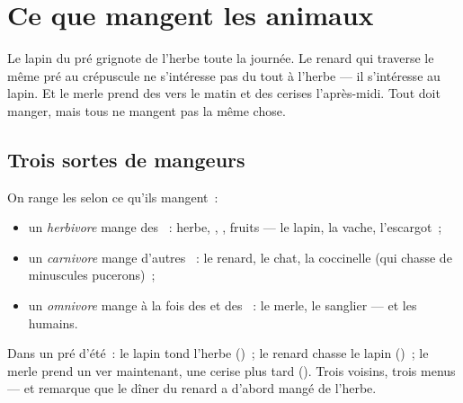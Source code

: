 \chapter{Ce que mangent les animaux}\label{ch:g2:what-animals-eat}

Le lapin du pré grignote de l'herbe toute la journée. Le renard qui
traverse le même pré au crépuscule ne s'intéresse pas du tout à
l'herbe --- il s'intéresse au lapin. Et le merle prend des vers le
matin et des cerises l'après-midi. Tout  doit manger, mais
tous ne mangent pas la même chose.

\section{Trois sortes de mangeurs}

\begin{definition}\label{def:g2:what-animals-eat:kinds}
On range les  selon ce qu'ils mangent~:
\begin{itemize}
  \item un \emph{herbivore} mange des ~:
        herbe, , , fruits --- le lapin, la vache,
        l'escargot~;
  \item un \emph{carnivore} mange d'autres
        ~: le renard, le chat, la coccinelle (qui chasse de
        minuscules pucerons)~;
  \item un \emph{omnivore} mange à la fois des
         et des ~: le merle, le sanglier --- et les
        humains.
\end{itemize}
\end{definition}

\begin{example}\label{ex:g2:what-animals-eat:meadow}
Dans un pré d'été~: le lapin tond l'herbe ()~; le renard
chasse le lapin ()~; le merle prend un ver maintenant, une
cerise plus tard (). Trois voisins, trois menus --- et
remarque que le dîner du renard a d'abord mangé de l'herbe.
\end{example}

